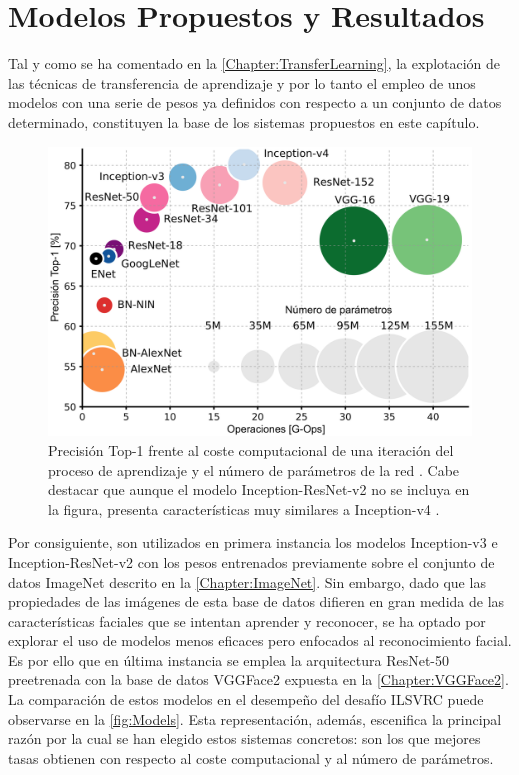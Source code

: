 \chapter{Modelos Propuestos y Resultados} \label{Chapter:5}

Tal y como se ha comentado en la \autoref{Chapter:TransferLearning}, la explotación de las técnicas de transferencia de aprendizaje y por lo tanto el empleo de unos modelos con una serie de pesos ya definidos con respecto a un conjunto de datos determinado, constituyen la base de los sistemas propuestos en este capítulo.

\begin{figure}
    \centering
    \includegraphics[scale=0.25]{Images/Models.png}
    \caption{Precisión Top-1 frente al coste computacional de una iteración del proceso de aprendizaje y el número de parámetros de la red \cite{Models}. Cabe destacar que aunque el modelo Inception-ResNet-v2 no se incluya en la figura, presenta características muy similares a Inception-v4 \cite{Inception-ResNet}.}
    \label{fig:Models}
\end{figure}

Por consiguiente, son utilizados en primera instancia los modelos Inception-v3 \cite{Inception-v3} e Inception-ResNet-v2 \cite{Inception-ResNet} con los pesos entrenados previamente sobre el conjunto de datos ImageNet descrito en la \autoref{Chapter:ImageNet}. Sin embargo, dado que las propiedades de las imágenes de esta base de datos difieren en gran medida de las características faciales que se intentan aprender y reconocer, se ha optado por explorar el uso de modelos menos eficaces pero enfocados al reconocimiento facial. Es por ello que en última instancia se emplea la arquitectura ResNet-50 preetrenada con la base de datos VGGFace2 expuesta en la \autoref{Chapter:VGGFace2}. La comparación de estos modelos en el desempeño del desafío ILSVRC puede observarse en la \autoref{fig:Models}. Esta representación, además, escenifica la principal razón por la cual se han elegido estos sistemas concretos: son los que mejores tasas obtienen con respecto al coste computacional y al número de parámetros.

